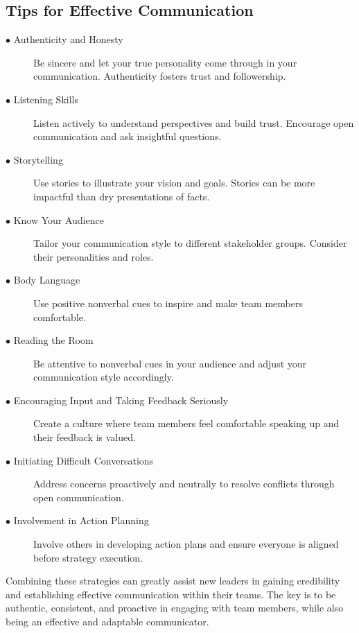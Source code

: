 \documentclass[runningheads]{llncs}
\begin{document}
\subsection{Tips for Effective Communication}

\begin{description}
 \item [$\bullet$ Authenticity and Honesty] Be sincere and let your true personality come through in your communication. Authenticity fosters trust and followership.\\
 \item [$\bullet$ Listening Skills] Listen actively to understand perspectives and build trust. Encourage open communication and ask insightful questions.\\
 \item [$\bullet$ Storytelling] Use stories to illustrate your vision and goals. Stories can be more impactful than dry presentations of facts.\\
 \item [$\bullet$ Know Your Audience] Tailor your communication style to different stakeholder groups. Consider their personalities and roles.\\
 \item [$\bullet$ Body Language] Use positive nonverbal cues to inspire and make team members comfortable.\\
 \item [$\bullet$ Reading the Room] Be attentive to nonverbal cues in your audience and adjust your communication style accordingly.\\
 \item [$\bullet$ Encouraging Input and Taking Feedback Seriously] Create a culture where team members feel comfortable speaking up and their feedback is valued.\\
 \item [$\bullet$ Initiating Difficult Conversations] Address concerns proactively and neutrally to resolve conflicts through open communication.\\
 \item [$\bullet$ Involvement in Action Planning] Involve others in developing action plans and ensure everyone is aligned before strategy execution.\\

\end{description}
 
Combining these strategies can greatly assist new leaders in gaining credibility and establishing effective communication within their teams. The key is to be authentic, consistent, and proactive in engaging with team members, while also being an effective and adaptable communicator.
\end{document}
